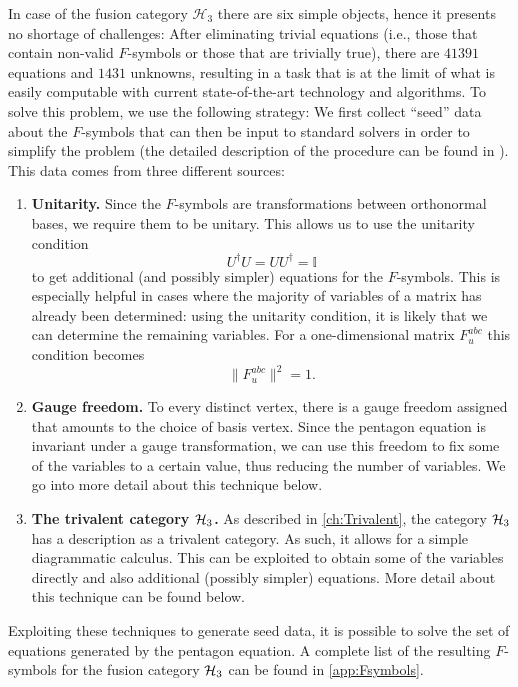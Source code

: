 {{{	In case of the fusion category $\mathcal{H}_3$ there are six simple objects, hence it presents no shortage of challenges: After eliminating trivial equations (i.e., those that contain non-valid $F$-symbols or those that are trivially true), there are $41391$ equations and $1431$ unknowns, resulting in a task that is at the limit of what is easily computable with current state-of-the-art technology and algorithms. To solve this problem, we use the following strategy: We first collect ``seed'' data about the $F$-symbols that can then be input to standard solvers in order to simplify the problem (the detailed description of the procedure can be found in \cite{Osborne2019}). This data comes from three different sources:
		\begin{enumerate}
			\item \textbf{Unitarity.} Since the $F$-symbols are transformations between orthonormal bases, we require them to be unitary. This allows us to use the unitarity condition
				\begin{equation}
					U^\dagger U=UU^\dagger=\mathbb{I}
				\end{equation}
			to get additional (and possibly simpler) equations for the $F$-symbols. This is especially helpful in cases where the majority of variables of a matrix has already been determined: using the unitarity condition, it is likely that we can determine the remaining variables. For a one-dimensional matrix $F_u^{abc}$ this condition becomes
				\begin{equation}
					\|F_u^{abc}\|^2=1.
				\end{equation}
			\item \textbf{Gauge freedom.} To every distinct vertex, there is a gauge freedom assigned that amounts to the choice of basis vertex. Since the pentagon equation is invariant under a gauge transformation, we can use this freedom to fix some of the variables to a certain value, thus reducing the number of variables. We go into more detail about this technique below.
			\item \textbf{The trivalent category ${\mathcal{H}_3}$.} As described in \cref{ch:Trivalent}, the category ${\mathcal{H}_3}$ has a description as a trivalent category. As such, it allows for a simple diagrammatic calculus. This can be exploited to obtain some of the variables directly and also additional (possibly simpler) equations. More detail about this technique can be found below.
		\end{enumerate}
	Exploiting these techniques to generate seed data, it is possible to solve the set of equations generated by the pentagon equation. A complete list of the resulting $F$-symbols for the fusion category ${\mathcal{H}_3}$ can be found in \cref{app:Fsymbols}.
	
}}}

